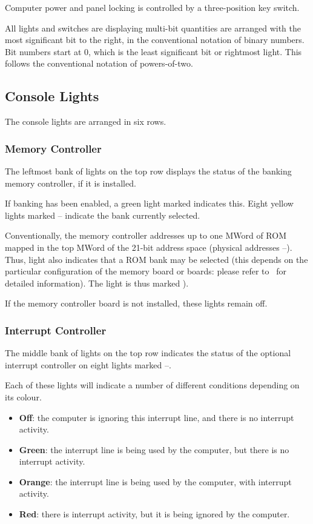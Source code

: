 Computer power and panel locking is controlled by a three-position key switch.

All lights and switches are displaying multi-bit quantities are arranged with
the most significant bit to the right, in the conventional notation of binary
numbers. Bit numbers start at 0, which is the least significant bit or
rightmost light. This follows the conventional notation of powers-of-two.

\subsection{Console Lights}

The console lights are arranged in six rows.

\subsubsection{Memory Controller}

The leftmost bank of lights on the top row displays the status of the banking
memory controller, if it is installed.

If banking has been enabled, a green light marked  indicates
this. Eight yellow lights marked – indicate the bank
currently selected.

Conventionally, the memory controller addresses up to one MWord of ROM mapped
in the top MWord of the 21-bit address space (physical addresses
–). Thus, light  also indicates that a ROM
bank may be selected (this depends on the particular configuration of the
memory board or boards: please refer to~ for detailed
information). The light is thus marked ).

If the memory controller board is not installed, these lights remain off.

\subsubsection{Interrupt Controller}

The middle bank of lights on the top row indicates the status of the optional
interrupt controller on eight lights marked –.

Each of these lights will indicate a number of different conditions depending
on its colour.

\begin{itemize}
  \item {\bfseries Off}: the computer is ignoring this interrupt line, and there is
    no interrupt activity.
  \item {\bfseries Green}: the interrupt line is being used by the computer, but
    there is no interrupt activity.
  \item {\bfseries Orange}: the interrupt line is being used by
    the computer, with interrupt activity.
  \item {\bfseries Red}: there is interrupt activity, but it is being ignored
    by the computer.
\end{itemize}

